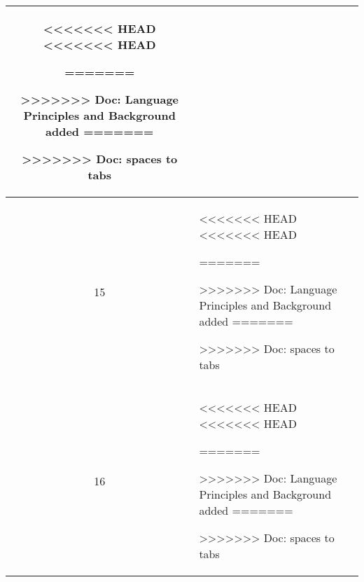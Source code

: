 \begin{center}
\begin{longtable}{|c|p{12cm}|}
\begin{journal}
<<<<<<< HEAD
<<<<<<< HEAD
	\item 
=======
  \item 
>>>>>>> Doc: Language Principles and Background added
=======
	\item 
>>>>>>> Doc: spaces to tabs
\end{journal}
\\ \hline
15 & 
\begin{journal}
<<<<<<< HEAD
<<<<<<< HEAD
	\item 
=======
  \item 
>>>>>>> Doc: Language Principles and Background added
=======
	\item 
>>>>>>> Doc: spaces to tabs
\end{journal}
\\ \hline
16 & 
\begin{journal}
<<<<<<< HEAD
<<<<<<< HEAD
	\item 
=======
  \item 
>>>>>>> Doc: Language Principles and Background added
=======
	\item 
>>>>>>> Doc: spaces to tabs
\end{journal}
\\ \hline
\end{longtable}
\end{center}
